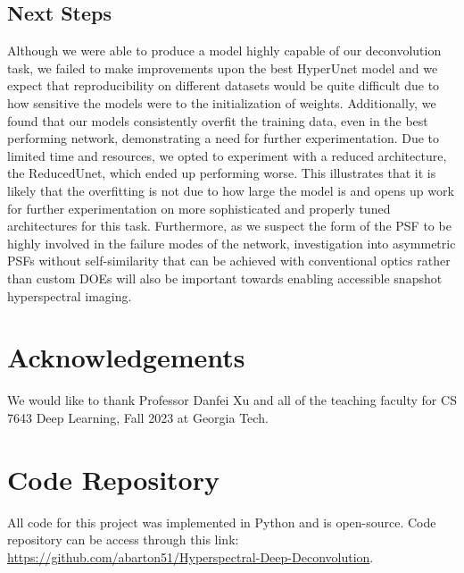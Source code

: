 \documentclass{article}
\begin{document}
\subsection{Next Steps}
Although we were able to produce a model highly capable of our deconvolution task, we failed to make improvements upon the best HyperUnet model and we expect that reproducibility on different datasets would be quite difficult due to how sensitive the models were to the initialization of weights. Additionally, we found that our models consistently overfit the training data, even in the best performing network, demonstrating a need for further experimentation. Due to limited time and resources, we opted to experiment with a reduced architecture, the ReducedUnet, which ended up performing worse. This illustrates that it is likely that the overfitting is not due to how large the model is and opens up work for further experimentation on more sophisticated and properly tuned architectures for this task. Furthermore, as we suspect the form of the PSF to be highly involved in the failure modes of the network, investigation into asymmetric PSFs without self-similarity that can be achieved with conventional optics rather than custom DOEs will also be important towards enabling accessible snapshot hyperspectral imaging. 

\section{Acknowledgements}
We would like to thank Professor Danfei Xu and all of the teaching faculty for CS 7643 Deep Learning, Fall 2023 at Georgia Tech.

\section{Code Repository}
All code for this project was implemented in Python and is open-source. Code repository can be access through this link: \href{https://github.com/abarton51/Hyperspectral-Deep-Deconvolution}{https://github.com/abarton51/Hyperspectral-Deep-Deconvolution}.
\end{document}
